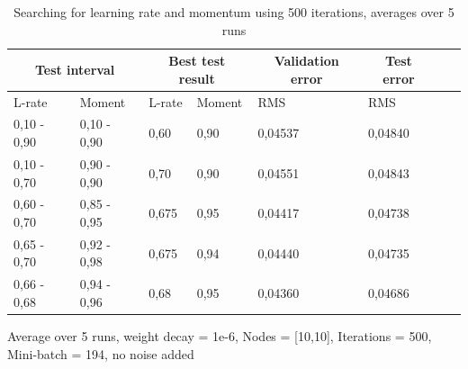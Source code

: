 \begin{table}[H]
\begin{threeparttable}
\begin{tabular}{ | p{1.6cm} | p{1.6cm} | l | l | l | l | l | l | } 
\hline 
\multicolumn{2}{|c|}{Test interval} & \multicolumn{2}{|c|}{Best test result} & \multicolumn{1}{|c|}{Validation error}  & \multicolumn{1}{|c|}{Test error} \\
\hline 
L-rate & Moment & L-rate & Moment & RMS  & RMS  \\
\hline
0,10 - 0,90 & 0,10 - 0,90 & 0,60 & 0,90 & 0,04537 & 0,04840 \\ %
\hline
0,10 - 0,70 & 0,90 - 0,90 & 0,70 & 0,90 & 0,04551 & 0,04843 \\ %
\hline
0,60 - 0,70 & 0,85 - 0,95 & 0,675 & 0,95 & 0,04417 & 0,04738 \\ %
\hline
0,65 - 0,70 & 0,92 - 0,98 & 0,675 & 0,94 & 0,04440 & 0,04735 \\ %
\hline
0,66 - 0,68 & 0,94 - 0,96 & 0,68 & 0,95 & 0,04360 & 0,04686 \\ %


\hline
\end{tabular}
\begin{tablenotes}
      \small
      \item Average over 5 runs, weight decay = 1e-6, Nodes = [10,10], Iterations = 500, Mini-batch = 194, no noise added
\end{tablenotes}
\caption{Searching for learning rate and momentum using 500 iterations, averages over 5 runs}
\label{tab:first_param_tuning}
\end{threeparttable}
\end{table}
